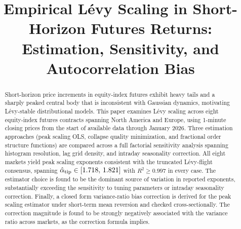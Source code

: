 \documentclass[conference]{IEEEtran}
\begin{document}
\title{Empirical L\'{e}vy Scaling in Short-Horizon Futures Returns:
       Estimation, Sensitivity, and Autocorrelation Bias}

\author{
\and
{}
}

\maketitle


\begin{abstract}
Short-horizon price increments in equity-index futures exhibit heavy tails
and a sharply peaked central body that is inconsistent with Gaussian dynamics,
motivating Lévy-stable distributional models.
This paper examines Lévy scaling across eight equity-index futures contracts
spanning North America and Europe, using 1-minute closing prices from the start
of available data through January 2026.
Three estimation approaches (peak scaling OLS, collapse quality
minimization, and fractional order structure functions) are compared
across a full factorial sensitivity analysis spanning histogram resolution,
lag grid density, and intraday seasonality correction.
All eight markets yield peak scaling exponents consistent with the
truncated Lévy-flight consensus, spanning $\hat{\alpha}_{\mathrm{tip}}\in[1.718,\,1.821]$
with $R^2\geq0.997$ in every case.
The estimator choice is found to be the dominant source of variation in
reported exponents, substantially exceeding the sensitivity to tuning
parameters or intraday seasonality correction.
Finally, a closed form variance-ratio bias correction is derived for the
peak scaling estimator under short-term mean reversion and checked
cross-sectionally. The correction magnitude is found to be strongly negatively
associated with the variance ratio across markets, as the correction formula
implies.
\end{abstract}
\end{document}
